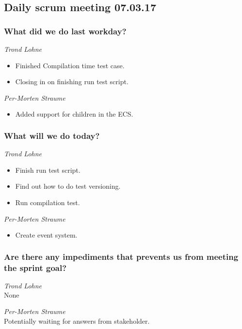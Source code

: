 \documentclass{article}
\begin{document}
\begin{center}
\subsection*{Daily scrum meeting 07.03.17}
\end{center}
\bigskip


\subsubsection*{What did we do last workday?}

\noindent\textit{Trond Lohne}
\begin{itemize}
	\item 
	Finished Compilation time test case.
	
	\item 
	Closing in on finishing run test script.
\end{itemize}

\medskip

\noindent\textit{Per-Morten Straume}
\begin{itemize}
	\item 
	Added support for children in the ECS.
\end{itemize}


\subsubsection*{What will we do today?}

\noindent\textit{Trond Lohne}
\begin{itemize}
	\item 
	Finish run test script.
	
	\item 
	Find out how to do test versioning.
	
	\item 
	Run compilation test.
\end{itemize}

\medskip

\noindent\textit{Per-Morten Straume}
\begin{itemize}
	\item 
	Create event system.
\end{itemize}


\subsubsection*{Are there any impediments that prevents us from meeting the sprint goal?}

\noindent\textit{Trond Lohne}\\
None

\medskip

\noindent\textit{Per-Morten Straume}\\
Potentially waiting for answers from stakeholder.
\end{document}
